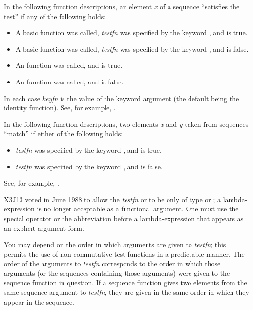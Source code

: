 In the following function descriptions, an element \emph{x} of a sequence
``satisfies the test'' if any of the following holds:
\begin{itemize}
\item
A basic function was called,
\emph{testfn} was specified by the keyword , and
 is true.

\item
A basic function was called,
\emph{testfn} was specified by the keyword , and
 is false.

\item
An  function was called, and
 is true.

\item
An  function was called, and
 is false.
\end{itemize}
In each case \emph{keyfn} is the
value of the  keyword argument (the default being the identity
function).  See, for example, .

In the following function descriptions,
two elements \emph{x} and \emph{y} taken from sequences ``match'' if
either of the following holds:
\begin{itemize}
\item
\emph{testfn} was specified by the keyword , and
 is true.

\item
\emph{testfn} was specified by the keyword , and
 is false.
\end{itemize}
See, for example, .


\begin{newer}
X3J13 voted in June 1988  to allow the \emph{testfn}
or 
to be only of type  or ; a lambda-expression
is no longer acceptable as a functional argument.  One must use the
 special operator or the abbreviation  before
a lambda-expression that appears as an  explicit argument form.
\end{newer}

You may depend on the order in which arguments
are given to \emph{testfn}; this permits the use of non-commutative
test functions in a predictable manner.
The order of the arguments to \emph{testfn} corresponds
to the order in which those arguments (or the sequences containing
those arguments)
were given to the sequence function in question.
If a sequence function gives two elements from the same
sequence argument to \emph{testfn}, they are given in the same order in
which they appear in the sequence.

